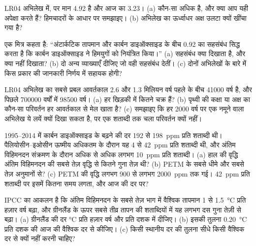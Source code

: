 \begin{exercise}[$\star\star$]\label{exo:g12:past-climates:10}
LR04 अभिलेख में,  पर मान
\qty{4.92}{\permil} है और आज का \qty{3.23}{\permil}। (a) कौन-सा अधिक है,
और क्या आप यही अपेक्षा करते हैं? हिमचादरों के आधार पर समझाइए। (b) अभिलेख का
ऊर्ध्वाधर अक्ष उलटा क्यों खींचा गया है?
\end{exercise}

\begin{exercise}[$\star\star$]\label{exo:g12:past-climates:11}
एक मित्र कहता है: ``अंटार्कटिक तापमान और कार्बन डाइऑक्साइड के बीच 0.92 का सहसंबंध
सिद्ध करता है कि कार्बन डाइऑक्साइड ने हिमयुगों को नियंत्रित किया।''
(a) सहसंबंध क्या दिखाता है, और क्या नहीं दिखाता? (b) दो
अन्य व्याख्याएँ दीजिए जो वही सहसंबंध देतीं। (c) दोनों अभिलेखों के बारे में किस प्रकार की
जानकारी निर्णय में सहायक होगी?
\end{exercise}

\begin{exercise}[$\star\star\star$]\label{exo:g12:past-climates:12}
LR04 अभिलेख का सबसे प्रबल आवर्तकाल 2.6
और 1.3 मिलियन वर्ष पहले के बीच \num{41000} वर्ष है, और पिछले \num{700000}
वर्षों में \num{98500} वर्ष। (a) हर खिड़की में कितने चक्र हैं? (b) पृथ्वी की
कक्षा या अक्ष का कौन-सा परिवर्तन हर आवर्तकाल से मेल खाता है? (c) समझाइए कि
हर \num{2000} वर्ष पर एक नमूने वाला अभिलेख ये लयें क्यों दिखा सकता है, पर एक शताब्दी तक चला
परिवर्तन क्यों नहीं।
\end{exercise}

\begin{exercise}[$\star\star\star$]\label{exo:g12:past-climates:13}
1995--2014 में कार्बन डाइऑक्साइड के बढ़ने की दर 192 से \qty{198}{ppm} प्रति शताब्दी
थी। पैलियोसीन--इओसीन ऊष्मीय अधिकतम के दौरान यह 4 से
\qty{42}{ppm} प्रति शताब्दी थी, और अंतिम विहिमनदन संक्रमण के दौरान अधिक से अधिक
लगभग \qty{10}{ppm} प्रति शताब्दी। (a) हाल की वृद्धि
अंतिम विहिमनदन की सबसे तेज़ वृद्धि से कितने गुना तेज़ थी? (b) PETM के सबसे धीमे और
सबसे तेज़ अनुमानों से? (c) PETM की वृद्धि लगभग 900 से लगभग
\qty{2000}{ppm} तक गई। \qty{42}{ppm} प्रति शताब्दी पर इसमें कितना समय लगता,
और आज की दर पर?
\end{exercise}

\begin{exercise}[$\star\star\star$]\label{exo:g12:past-climates:14}
IPCC का आकलन है कि अंतिम विहिमनदन के सबसे तेज़ भाग में वैश्विक तापमान 1 से
\qty{1.5}{\degreeCelsius} प्रति हज़ार वर्ष बढ़ा, और
ग्रीनलैंड के ऊपर सबसे तीव्र तापन की शताब्दियों में यह लगभग दस गुना तेज़ी से बढ़ा।
(a) ग्रीनलैंड की दर \unit{\degreeCelsius} प्रति हज़ार वर्ष और प्रति दशक में
दीजिए। (b) इसकी तुलना \qty{0.20}{\degreeCelsius} प्रति दशक की
आज की वैश्विक दर से कीजिए। (c) किसी स्थानीय दर की तुलना सीधे किसी वैश्विक दर से
क्यों नहीं करनी चाहिए?
\end{exercise}

